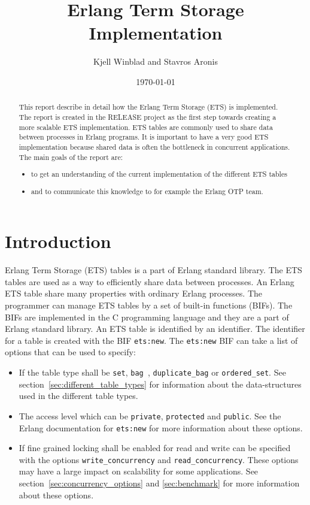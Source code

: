 \documentclass[aps,pre,preprint,nofootinbib]{revtex4}
\begin{document}
\title{Erlang Term Storage Implementation}
\author{Kjell Winblad and Stavros Aronis}
\date{\today}


\begin{abstract}

  This report describe in detail how the Erlang Term Storage (ETS) is implemented.
  The report is created in the RELEASE project as the first step towards creating a more scalable ETS implementation.
  ETS tables are commonly used to share data between processes in Erlang programs.
  It is important to have a very good ETS implementation because shared data is often the bottleneck in concurrent applications.
  The main goals of the report are:
  \begin{itemize}
   \item to get an understanding of the current implementation of the different ETS tables
   \item and to communicate this knowledge to for example the Erlang OTP team. 
  \end{itemize}

\end{abstract}

\maketitle

\section{Introduction}

Erlang Term Storage (ETS) tables is a part of Erlang standard library. 
The ETS tables are used as a way to efficiently share data between processes. 
An Erlang ETS table share many properties with ordinary Erlang processes. 
The programmer can manage ETS tables by a set of built-in functions (BIFs). 
The BIFs are implemented in the C programming language and they are a part of Erlang standard library. An ETS table is identified by an identifier.
The identifier for a table is created with the BIF \verb|ets:new|.
The \verb|ets:new| BIF can take a list of options that can be used to specify: 

\begin{itemize}
 \item 
 If the table type shall be \verb|set|, \verb|bag |, \verb|duplicate_bag| or \verb|ordered_set|. 
 See section~\ref{sec:different_table_types} for information about the data-structures used in the different table types.
 \item 
 The access level which can be \verb|private|, \verb|protected| and \verb|public|.
 See the Erlang documentation for \verb|ets:new| for more information about these options.
 \item 
 If fine grained locking shall be enabled for read and write can be specified with the options \verb|write_concurrency| and \verb|read_concurrency|. 
 These options may have a large impact on scalability for some applications.
 See section~\ref{sec:concurrency_options} and \ref{sec:benchmark} for more information about these options.
\end{itemize}
\end{document}

